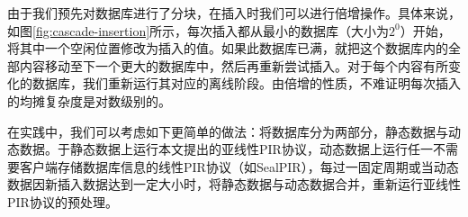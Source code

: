 由于我们预先对数据库进行了分块，在插入时我们可以进行倍增操作。具体来说，如图\ref{fig:cascade-insertion}所示，每次插入都从最小的数据库（大小为$2^0$）开始，将其中一个空闲位置修改为插入的值。如果此数据库已满，就把这个数据库内的全部内容移动至下一个更大的数据库中，然后再重新尝试插入。对于每个内容有所变化的数据库，我们重新运行其对应的离线阶段。由倍增的性质，不难证明每次插入的均摊复杂度是对数级别的。

在实践中，我们可以考虑如下更简单的做法：将数据库分为两部分，静态数据与动态数据。于静态数据上运行本文提出的亚线性PIR协议，动态数据上运行任一不需要客户端存储数据库信息的线性PIR协议（如SealPIR\cite{SP:ACLS18}），每过一固定周期或当动态数据因新插入数据达到一定大小时，将静态数据与动态数据合并，重新运行亚线性PIR协议的预处理。